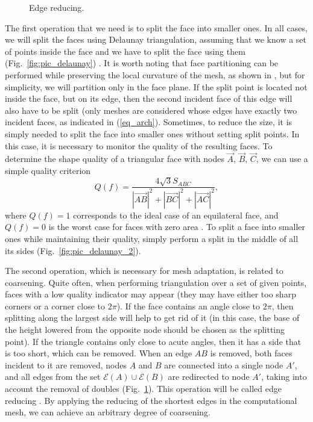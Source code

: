 \documentclass[
11pt,
tightenlines,
twoside,
onecolumn,
nofloats,
nobibnotes,
nofootinbib,
superscriptaddress,
noshowpacs,
centertags]
{revtex4-2}
\begin{document}
\begin{figure}[h]
\begin{minipage}[h]{0.28\textwidth}
    \caption{Edge reducing.}\label{fig:pic_reduce_edge}
  \end{minipage}
\end{figure}

The first operation that we need is to split the face into smaller ones.
In all cases, we will split the faces using Delaunay triangulation, assuming that we know a set of points inside the face and we have to split the face using them (Fig.~\ref{fig:pic_delaunay}) \cite{Rivara}.
It is worth noting that face partitioning can be performed while preserving the local curvature of the mesh, as shown in \cite{Rakotoarivelo}, but for simplicity, we will partition only in the face plane.
If the split point is located not inside the face, but on its edge, then the second incident face of this edge will also have to be split (only meshes are considered whose edges have exactly two incident faces, as indicated in (\ref{eq_arch}).
Sometimes, to reduce the size, it is simply needed to split the face into smaller ones without setting split points.
In this case, it is necessary to monitor the quality of the resulting faces.
To determine the shape quality of a triangular face with nodes
$\vec{A}$, $\vec{B}$, $\vec{C}$, we can use a simple quality
criterion
\begin{equation}
Q(f) = \frac{4\sqrt{3} S_{ABC}}{|\vec{AB}|^2 + |\vec{BC}|^2 +
|\vec{AC}|^2},
\end{equation}
where $Q(f) = 1$ corresponds to the ideal case of an equilateral
face, and $Q(f) = 0$ is the worst case for faces with zero area
\cite{Borouchaki}.
To split a face into smaller ones while maintaining their quality, simply perform a split in the middle of all its sides (Fig.~\ref{fig:pic_delaunay_2}).

The second operation, which is necessary for mesh adaptation, is related to coarsening.
Quite often, when performing triangulation over a set of given points, faces with a low quality indicator may appear (they may have either too sharp corners or a corner close to $2 \pi$).
If the face contains an angle close to $2 \pi$, then splitting along the largest side will help to get rid of it (in this case, the base of the height lowered from the opposite node should be chosen as the splitting point).
If the triangle contains only close to acute angles, then it has a side that is too short, which can be removed.
When an edge $AB$ is removed, both faces incident to it are removed, nodes $A$ and $B$ are connected into a single node $A'$, and all edges from the set $\mathscr{E}(A) \cup \mathscr{E} (B)$ are redirected to node $A'$, taking into account the removal of doubles (Fig.~\ref{fig:pic_reduce_edge}).
This operation will be called edge reducing \cite{Panchal}.
By applying the reducing of the shortest edges in the  computational
mesh, we can achieve an arbitrary degree of coarsening.
\end{document}
